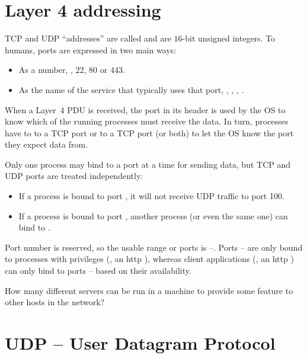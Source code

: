 \section{Layer 4 addressing}\label{sec:layer4:addressing}

TCP and UDP ``addresses'' are called  and are $16$-bit unsigned integers.
To humans, ports are expressed in two main ways:
\begin{itemize}
\item As a number, \eg, 22, 80 or 443.
\item As the name of the service that typically uses that port, \eg, , , .
\end{itemize}

When a Layer~4 PDU is received, the port in its header is used by the OS to know which of the running 
processes must receive the data. 
In turn, processes have to  to a TCP port or to a TCP port (or both)
to let the OS know the port they expect data from.

Only one process may bind to a port at a time for sending data, but TCP and UDP ports
are treated independently:
\begin{itemize}
 \item If a process is bound to port , it will not receive UDP traffic to port 100.
 \item If a process is bound to port , another process (or even the same one) can 
   bind to .  
\end{itemize}

Port number  is reserved, so the usable range or ports is --. 
Ports -- are only bound to 
processes with privileges (\eg, an http ), whereas client applications (\eg, an http ) 
can only bind to ports -- based on their availability.

\begin{exercise}
How many different servers can be run in a machine to provide some feature to other hosts in the network?
\end{exercise}


\section{UDP -- User Datagram Protocol}\label{sec:layer4:udp}
